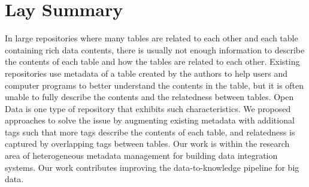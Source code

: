 

\chapter{Lay Summary}

In large repositories where many tables are related to each other and each table containing rich data contents, there is usually not enough information to describe the contents of each table and how the tables are related to each other. Existing repositories use metadata of a table created by the authors to help users and computer programs to better understand the contents in the table, but it is often unable to fully describe the contents and the relatedness between tables. Open Data is one type of repository that exhibits such characteristics. We proposed approaches to solve the issue by augmenting existing metadata with additional tags such that more tags describe the contents of each table, and relatedness is captured by overlapping tags between tables. Our work is within the research area of heterogeneous metadata management for building data integration systems. Our work contributes improving the data-to-knowledge pipeline for big data.
